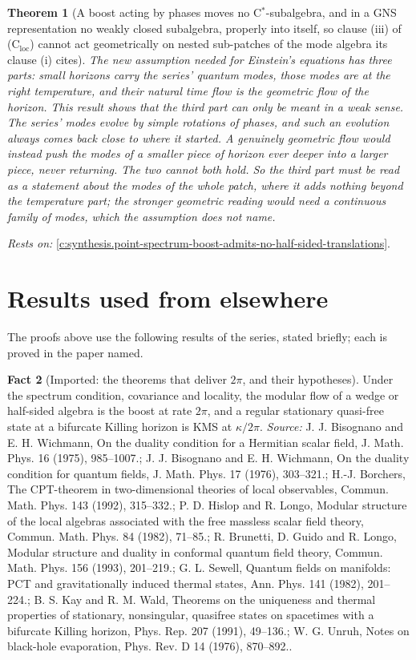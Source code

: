 \documentclass[11pt]{article}
\newtheorem{theorem}{Theorem}[section]
\theoremstyle{definition}
\newtheorem{fact}[theorem]{Fact}
\theoremstyle{plain}
\begin{document}
\begin{theorem}[A boost acting by phases moves no C$^{*}$-subalgebra, and in a GNS representation no weakly closed subalgebra, properly into itself, so clause (iii) of (C$_{\mathrm{loc}}$) cannot act geometrically on nested sub-patches of the mode algebra its clause (i) cites]\label{c:synthesis.c-loc-modular-clause-moves-no-nested-patch}
The new assumption needed for Einstein's equations has three parts: small horizons carry the series' quantum modes, those modes are at the right temperature, and their natural time flow is the geometric flow of the horizon. This result shows that the third part can only be meant in a weak sense. The series' modes evolve by simple rotations of phases, and such an evolution always comes back close to where it started. A genuinely geometric flow would instead push the modes of a smaller piece of horizon ever deeper into a larger piece, never returning. The two cannot both hold. So the third part must be read as a statement about the modes of the whole patch, where it adds nothing beyond the temperature part; the stronger geometric reading would need a continuous family of modes, which the assumption does not name.
\end{theorem}
\noindent\emph{Rests on:} \ref{c:synthesis.point-spectrum-boost-admits-no-half-sided-translations}.

\section{Results used from elsewhere}
The proofs above use the following results of the series, stated briefly; each is proved in the paper named.

\begin{fact}[Imported: the theorems that deliver $2\pi$, and their hypotheses]\label{c:angle.imported-theorems-deliver-their-hypotheses}
Under the spectrum condition, covariance and locality, the modular flow of a wedge or half-sided algebra is the boost at rate $2\pi$, and a regular stationary quasi-free state at a bifurcate Killing horizon is KMS at $\kappa/2\pi$.
\emph{Source:} J. J. Bisognano and E. H. Wichmann, On the duality condition for a Hermitian scalar field, J. Math. Phys. 16 (1975), 985--1007.; J. J. Bisognano and E. H. Wichmann, On the duality condition for quantum fields, J. Math. Phys. 17 (1976), 303--321.; H.-J. Borchers, The CPT-theorem in two-dimensional theories of local observables, Commun. Math. Phys. 143 (1992), 315--332.; P. D. Hislop and R. Longo, Modular structure of the local algebras associated with the free massless scalar field theory, Commun. Math. Phys. 84 (1982), 71--85.; R. Brunetti, D. Guido and R. Longo, Modular structure and duality in conformal quantum field theory, Commun. Math. Phys. 156 (1993), 201--219.; G. L. Sewell, Quantum fields on manifolds: PCT and gravitationally induced thermal states, Ann. Phys. 141 (1982), 201--224.; B. S. Kay and R. M. Wald, Theorems on the uniqueness and thermal properties of stationary, nonsingular, quasifree states on spacetimes with a bifurcate Killing horizon, Phys. Rep. 207 (1991), 49--136.; W. G. Unruh, Notes on black-hole evaporation, Phys. Rev. D 14 (1976), 870--892..
\end{fact}
\end{document}
